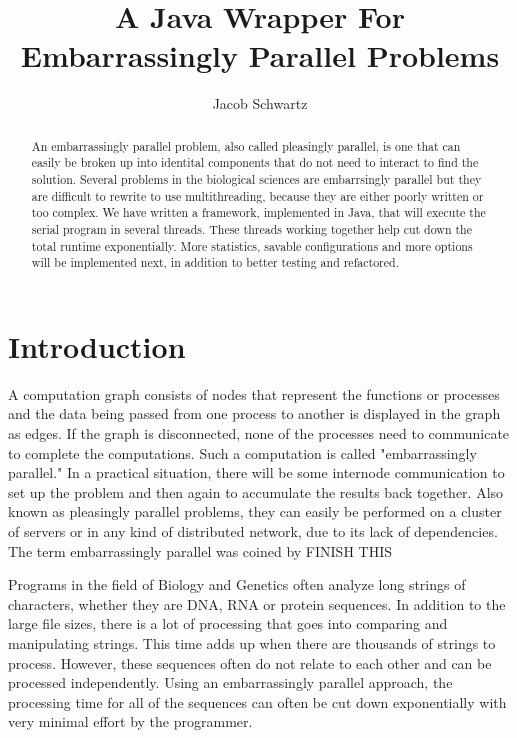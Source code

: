 \documentclass[12pt]{article}
\begin{document}
\title{A Java Wrapper For Embarrassingly Parallel Problems}
\author{Jacob Schwartz}
\maketitle

\begin{abstract}
An embarrassingly parallel problem, also called pleasingly parallel, is one that 
can easily be broken up into identital components that do not need to interact 
to find the solution. Several problems in the biological sciences are 
embarrsingly parallel but they are difficult to rewrite to use multithreading, 
because they are either poorly written or too complex. We have written a 
framework, implemented in Java, that will execute the serial program in several 
threads. These threads working together help cut down the total runtime
exponentially. More statistics, savable configurations and more options will be 
implemented next, in addition to better testing and refactored.
\end{abstract}

\section{Introduction}

A computation graph consists of nodes that represent the functions or processes 
and the data being passed from one process to another is displayed in the graph 
as edges. If the graph is disconnected, none of the processes need to 
communicate to complete the computations. Such a computation is called
"embarrassingly parallel." In a practical situation, there will be some 
internode communication to set up the problem and then again to accumulate the 
results back together. Also known as pleasingly parallel problems, they can 
easily be performed on a cluster of servers or in any kind of distributed 
network, due to its lack of dependencies. The term  embarrassingly parallel was 
coined by FINISH THIS 

Programs in the field of Biology and Genetics often analyze long strings of
characters, whether they are DNA, RNA or protein sequences. In addition to the
large file sizes, there is a lot of processing that goes into comparing and
manipulating strings. This time adds up when there are thousands of strings to 
process. However, these sequences often do not relate to each other and can be 
processed independently. Using an embarrassingly parallel approach, the 
processing time for all of the sequences can often be cut down exponentially 
with very minimal effort by the programmer.
\end{document}
